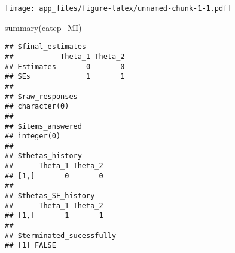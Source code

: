 \documentclass[
]{article}
\newenvironment{Shaded}{\begin{snugshade}}{\end{snugshade}}
\newcommand{\FunctionTok}[1]{\textcolor[rgb]{0.00,0.00,0.00}{#1}}
\newcommand{\NormalTok}[1]{#1}
\begin{document}
\texttt{[image: app\_files/figure-latex/unnamed-chunk-1-1.pdf]}

\begin{Shaded}
\begin{Highlighting}[]
\FunctionTok{summary}\NormalTok{(catep\_MI)}
\end{Highlighting}
\end{Shaded}

\begin{verbatim}
## $final_estimates
##           Theta_1 Theta_2
## Estimates       0       0
## SEs             1       1
## 
## $raw_responses
## character(0)
## 
## $items_answered
## integer(0)
## 
## $thetas_history
##      Theta_1 Theta_2
## [1,]       0       0
## 
## $thetas_SE_history
##      Theta_1 Theta_2
## [1,]       1       1
## 
## $terminated_sucessfully
## [1] FALSE
\end{verbatim}
\end{document}
